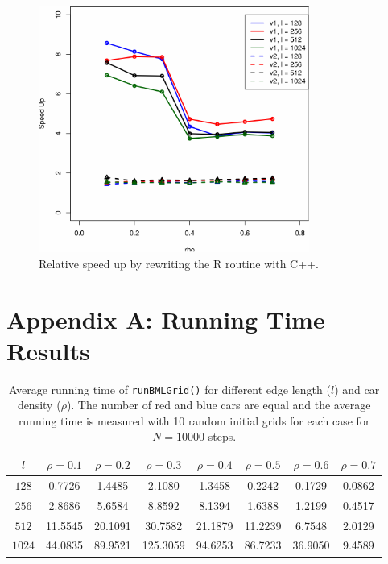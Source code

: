 \documentclass{article}
\begin{document}
\begin{figure}[H]
    \centering
    \includegraphics[width=3.5in]{figs/SpeedUp.pdf}
    \caption{Relative speed up by rewriting the R routine with C++.}
    \label{fig:speed_up}
\end{figure}





\section*{Appendix A: Running Time Results}
\label{sec:append_A}
\begin{table}[H]
    \renewcommand{\arraystretch}{1.3}
    \caption{Average running time of \texttt{runBMLGrid()} for different edge
    length ($l$) and car density ($\rho$). The number of red and blue cars are
    equal and the average running time is measured with 10 random initial grids
    for each case for $N=10000$ steps.}
    \label{tab:time_runBMLGrid}
    \centering
    \begin{tabular}{c|ccccccc}
        \hline
          $l$ & $\rho = 0.1$ & $\rho = 0.2$& $\rho = 0.3$ &$\rho = 0.4$ & $\rho
          = 0.5$ & $\rho = 0.6$ & $\rho = 0.7$ \\
        \hline
        $128$ & 0.7726 & 1.4485 & 2.1080 & 1.3458 & 0.2242 & 0.1729 & 0.0862 \\
        $256$ & 2.8686 & 5.6584 & 8.8592 & 8.1394 & 1.6388 &  1.2199 & 0.4517 \\
        $512$ & 11.5545 & 20.1091 & 30.7582 & 21.1879 & 11.2239 & 6.7548 &
        2.0129\\
        $1024$ & 44.0835 & 89.9521 & 125.3059 & 94.6253 & 86.7233 & 36.9050 & 
        9.4589\\
        \hline
    \end{tabular}
\end{table}
\end{document}
